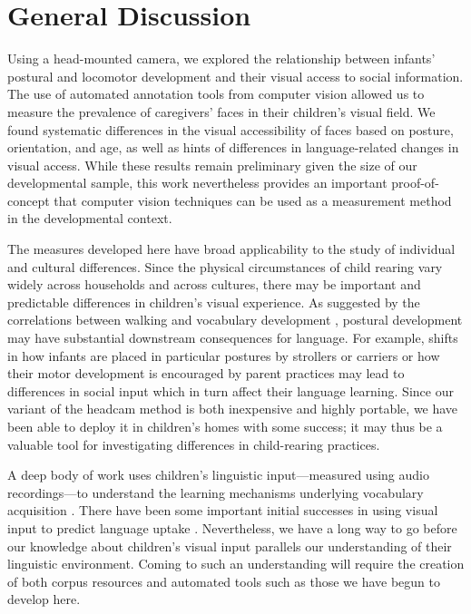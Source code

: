 \documentclass[10pt,letterpaper]{article}
\begin{document}
\section{General Discussion}

Using a head-mounted camera, we explored the relationship between infants' postural and locomotor development and their visual access to social information. The use of automated annotation tools from computer vision allowed us to measure the prevalence of caregivers' faces in their children's visual field. We found systematic differences in the visual accessibility of faces based on posture, orientation, and age, as well as hints of differences in language-related changes in visual access. While these results remain preliminary given the size of our developmental sample, this work nevertheless provides an important proof-of-concept that computer vision techniques can be used as a measurement method in the developmental context. 

The measures developed here have broad applicability to the study of individual and cultural differences. Since the physical circumstances of child rearing vary widely across households and across cultures, there may be important and predictable differences in children's visual experience. As suggested by the correlations between walking and vocabulary development \cite{walleunderreview}, postural development may have substantial downstream consequences for language. For example, shifts in how infants are placed in particular postures by strollers or carriers \cite{zeedyk2008} or how their motor development is encouraged by parent practices \cite{bril1986} may lead to differences in social input which in turn affect their language learning. Since our variant of the headcam method is both inexpensive and highly portable, we have been able to deploy it in children's homes with some success; it may thus be a valuable tool for investigating differences in child-rearing practices.

A deep body of work uses children's linguistic input---measured using audio recordings---to understand the learning mechanisms underlying vocabulary acquisition \cite{huttenlocher1991,hart1995,fernald2006}. There have been some important initial successes in using visual input to predict language uptake \cite{yuinpress}. Nevertheless, we have a long way to go before our knowledge about children's visual input parallels our understanding of their linguistic environment. Coming to such an understanding will require the creation of both corpus resources and automated tools such as those we have begun to develop here.
\end{document}
